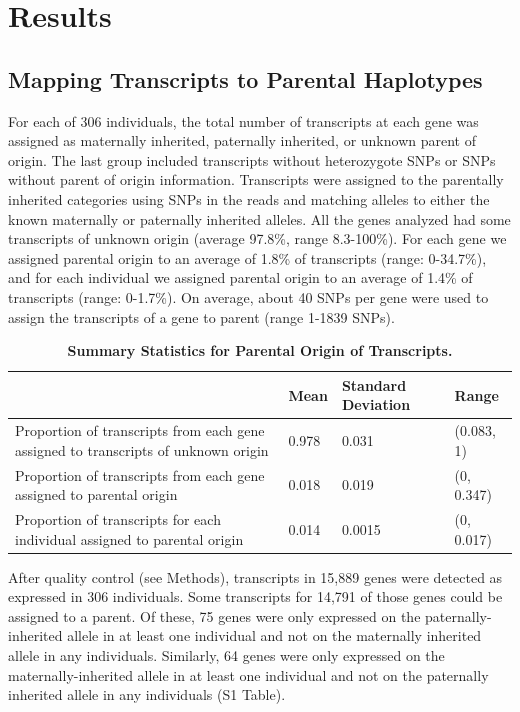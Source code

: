 \section{Results}\label{ch03-results}
\subsection{Mapping Transcripts to Parental Haplotypes}\label{Mapping Transcripts to Parental Haplotypes}
For each of 306 individuals, the total number of transcripts at each gene was assigned as maternally inherited, paternally inherited, or unknown parent of origin. The last group included transcripts without heterozygote SNPs or SNPs without parent of origin information. Transcripts were assigned to the parentally inherited categories using SNPs in the reads and matching alleles to either the known maternally or paternally inherited alleles. All the genes analyzed had some transcripts of unknown origin (average 97.8\%, range 8.3-100\%). For each gene we assigned parental origin to an average of 1.8\% of transcripts (range: 0-34.7\%), and for each individual we assigned parental origin to an average of 1.4\% of transcripts (range: 0-1.7\%). On average, about 40 SNPs per gene were used to assign the transcripts of a gene to parent (range 1-1839 SNPs). 



\begin{table}
\centering
\begin{adjustbox}{width={\textwidth}}
\begin{tabular}{@{}p{10cm}p{2cm}p{4cm}p{2cm}@{}}
\toprule & Mean & Standard Deviation & Range \\ \midrule
 Proportion of transcripts from each gene assigned to transcripts of unknown origin & 0.978 & 0.031 & (0.083, 1) \\
 Proportion of transcripts from each gene assigned to parental origin & 0.018 & 0.019 & (0, 0.347) \\
 Proportion of transcripts for each individual assigned to parental origin & 0.014 & 0.0015 & (0, 0.017) \\ \bottomrule
\end{tabular}
\end{adjustbox}
\caption[Summary Statistics for Parental Origin of Transcripts.]{\textbf{Summary Statistics for Parental Origin of Transcripts.}}
\label{tab:summarystats}
\end{table}




After quality control (see Methods), transcripts in 15,889 genes were detected as expressed in 306 individuals. Some transcripts for 14,791 of those genes could be assigned to a parent. Of these, 75 genes were only expressed on the paternally-inherited allele in at least one individual and not on the maternally inherited allele in any individuals. Similarly, 64 genes were only expressed on the maternally-inherited allele in at least one individual and not on the paternally inherited allele in any individuals (S1 Table).

